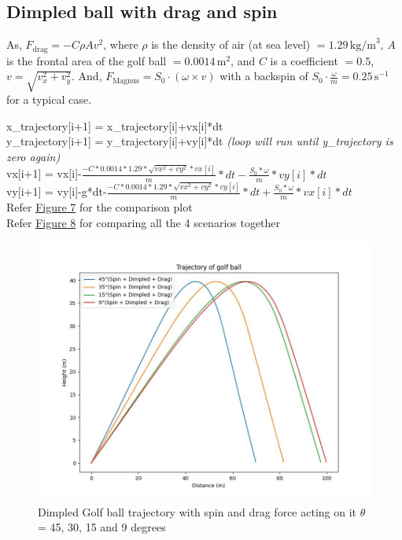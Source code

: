 \documentclass[11pt]{article}
\begin{document}
\subsection{Dimpled ball with drag and spin}

As, \(F_{\text{drag}} = -C\rho Av^2\), where \(\rho\) is the density of air (at sea level) \(= 1.29 \, \text{kg/m}^3\), \(A\) is the frontal area of the golf ball \(= 0.0014 \, \text{m}^2\), and \(C\) is a coefficient \(= 0.5\), \(v = \sqrt{v_x^2 + v_y^2}\).
And, \(F_{\text{Magnus}} = S_0 \cdot (\omega \times v)\) with a backspin of \(S_0 \cdot \frac{\omega}{m} = 0.25 \, \text{s}^{-1}\) for a typical case.

\begin{raggedright}
\begin{justify}
x\_trajectory[i+1] = x\_trajectory[i]+vx[i]*dt\\
y\_trajectory[i+1] = y\_trajectory[i]+vy[i]*dt \textit{(loop will run until y\_trajectory is zero again)}\\
vx[i+1] = vx[i]-$\frac{-C*0.0014*1.29*\sqrt{vx^2+vy^2}*vx[i]}{m}*dt - \frac{S_0 * \omega}{m}*vy[i]*dt$\\
vy[i+1] = vy[i]-g*dt-$\frac{-C*0.0014*1.29*\sqrt{vx^2+vy^2}*vy[i]}{m}*dt + \frac{S_0 * \omega}{m}*vx[i]*dt$\\
Refer \hyperref[fig:Spin_Dimpled_Fdrag_trajectory]{Figure 7} for the comparison plot\\
Refer \hyperref[fig:trajectory]{Figure 8} for comparing all the 4 scenarios together
\end{justify}
\end{raggedright}
\begin{figure}[b]
    \centering
    \includegraphics[width=\textwidth, height=\textheight, keepaspectratio]{Golf_Trajectory_Spin_Dimpled_drag.jpeg}
    \caption{Dimpled Golf ball trajectory with spin and drag force acting on it $\theta$ = 45, 30, 15 and 9 degrees}
    \label{fig:Spin_Dimpled_Fdrag_trajectory}
\end{figure}
\end{document}
